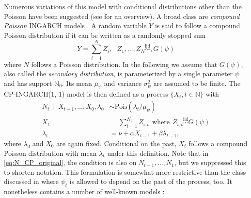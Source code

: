 \documentclass[review]{elsarticle}
\begin{document}
Numerous variations of this model with conditional distributions other than the Poisson have been suggested (see \cite{Weiss2018} for an overview). A broad class are \textit{compound Poisson} INGARCH models \cite{Goncalves2015, Silva2016}. A random variable $Y$ is said to follow a compound Poisson distribution \cite[Chapter 3]{Feller1968} if it can be written as a randomly stopped sum 
$$
Y = \sum_{i = 1}^N Z_i, \ \ \ Z_1, \dots, Z_N \stackrel{\text{iid}}{\sim}, G(\psi)
$$
where $N$ follows a Poisson distribution. In the following we assume that $G(\psi)$, also called the \textit{secondary distribution}, is parameterized by a single parameter $\psi$ and has support $\mathbb{N}_0$. Its mean $\mu_\psi$ and variance $\sigma^2_\psi$ are assumed to be finite. The CP-INGARCH(1, 1) model is then defined as a process $\{X_t, t \in \mathbb{N}\}$ with %
\begin{align}
N_t \ \mid \ X_{t - 1}, \dots, X_0, \lambda_0 & \sim \text{Pois}(\lambda_t/\mu_\psi) \label{eq:N_CP_original}\\
X_t & = \sum_{i = 1}^{N_t} Z_{i, t} \ \ \text{where} \ \  Z_{i, t} \stackrel{\text{iid}}{\sim} G(\psi)\label{eq:X_CP_original}\\
\lambda_t & = \nu + \alpha X_{t - 1} + \beta \lambda_{t - 1},\label{eq:lambda_CP_original}
\end{align}
where $\lambda_0$ and $X_0$ are again fixed. Conditional on the past, $X_t$ follows a compound Poisson distribution with mean $\lambda_t$ under this definition. Note that in \eqref{eq:N_CP_original}, the condition is also on $N_{t - 1}, \dots, N_1$, but we suppressed this to shorten notation. This formulation is somewhat more restrictive than the class discussed in \citep{Goncalves2015} where $\psi_t$ is allowed to depend on the past of the process, too. It nonetheless contains a number of well-known models \cite[Observation 2]{Goncalves2015}:
\end{document}
